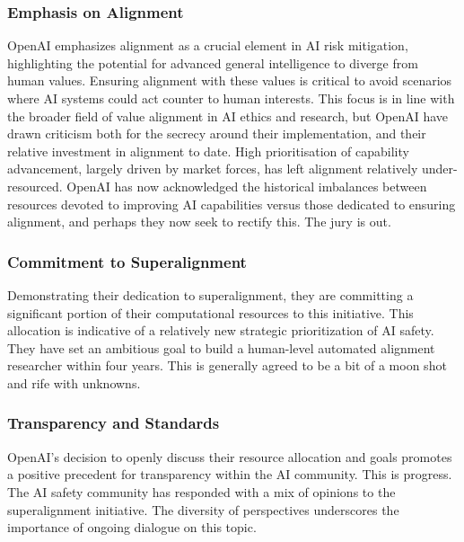 \subsubsection{Emphasis on Alignment}
OpenAI emphasizes alignment as a crucial element in AI risk mitigation, highlighting the potential for advanced general intelligence to diverge from human values. Ensuring alignment with these values is critical to avoid scenarios where AI systems could act counter to human interests. This focus is in line with the broader field of value alignment in AI ethics and research, but OpenAI have drawn criticism both for the secrecy around their implementation, and their relative investment in alignment to date. High prioritisation of capability advancement, largely driven by market forces, has left alignment relatively under-resourced. OpenAI has now acknowledged the historical imbalances between resources devoted to improving AI capabilities versus those dedicated to ensuring alignment, and perhaps they now seek to rectify this. The jury is out.

\subsubsection{Commitment to Superalignment}
Demonstrating their dedication to superalignment, they are committing a significant portion of their computational resources to this initiative. This allocation is indicative of a relatively new strategic prioritization of AI safety.
They have set an ambitious goal to build a human-level automated alignment researcher within four years. This is generally agreed to be a bit of a moon shot and rife with unknowns.
\subsubsection{Transparency and Standards}
OpenAI's decision to openly discuss their resource allocation and goals promotes a positive precedent for transparency within the AI community. This is progress. The AI safety community has responded with a mix of opinions to the superalignment initiative. The diversity of perspectives underscores the importance of ongoing dialogue on this topic.

